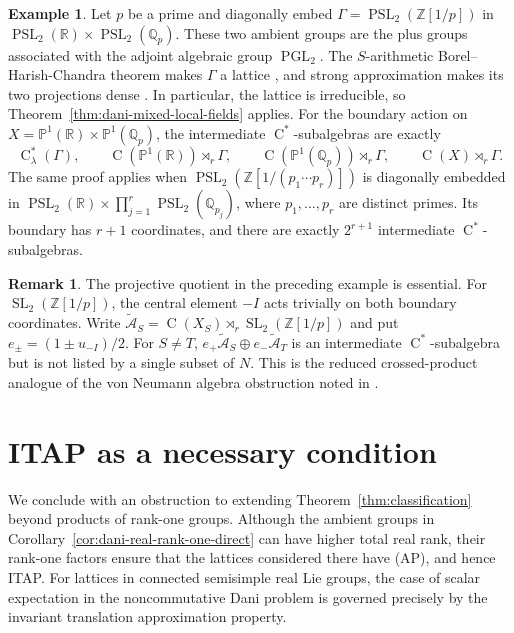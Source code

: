 \documentclass[11pt]{amsart}
\numberwithin{equation}{section}
\newcommand{\R}{\mathbb{R}}
\newcommand{\Z}{\mathbb{Z}}
\newcommand{\Q}{\mathbb{Q}}
\newcommand{\PSL}{\operatorname{PSL}}
\newcommand{\SL}{\operatorname{SL}}
\newcommand{\PGL}{\operatorname{PGL}}
\newcommand{\rC}{\operatorname{C}}
\theoremstyle{definition}
\newtheorem{remark}[theorem]{Remark}
\newtheorem{example}[theorem]{Example}
\begin{document}
	\begin{example}
		Let $p$ be a prime and diagonally embed $\Gamma=\PSL_2(\Z[1/p])$ in
		$\PSL_2(\R)\times\PSL_2(\Q_p)$.
		These two ambient groups are the plus groups associated with the adjoint
		algebraic group $\PGL_2$.
		The $S$-arithmetic Borel--Harish-Chandra theorem makes $\Gamma$ a lattice
		\cite[Theorem~I.3.2.5]{Ma91}, and strong approximation makes its two projections
		dense \cite[\S II.6.8]{Ma91}. In particular, the lattice is
		irreducible, so Theorem~\ref{thm:dani-mixed-local-fields} applies. For the
		boundary action on
		$X=\mathbb P^1(\R)\times\mathbb P^1(\Q_p)$, the intermediate
		$\rC^*$-subalgebras are exactly
		\[
		\rC^*_\lambda(\Gamma),\qquad
		\rC(\mathbb P^1(\R))\rtimes_r\Gamma,\qquad
		\rC(\mathbb P^1(\Q_p))\rtimes_r\Gamma,\qquad
		\rC(X)\rtimes_r\Gamma.
		\]
		The same proof applies when
		$\PSL_2\left(\Z\left[1/(p_1\cdots p_r)\right]\right)$ is diagonally embedded in
		$\PSL_2(\R)\times\prod_{j=1}^r\PSL_2(\Q_{p_j})$, where
		$p_1,\ldots,p_r$ are distinct primes. Its boundary has $r+1$
		coordinates, and there are exactly $2^{r+1}$ intermediate $\rC^*$-subalgebras.
	\end{example}
	
	\begin{remark}
		The projective quotient in the preceding example is essential. For
		$\SL_2(\Z[1/p])$, the central element $-I$ acts trivially on both boundary
		coordinates. Write
		\(\widetilde{\mathcal A}_S=\rC(X_S)\rtimes_r\SL_2(\Z[1/p])\) and put
		\(e_\pm=(1\pm u_{-I})/2\). For \(S\neq T\),
		\(e_+\widetilde{\mathcal A}_S\oplus
		e_-\widetilde{\mathcal A}_T\) is an intermediate \(\rC^*\)-subalgebra but is not listed by a single
		subset of \(N\). This is the reduced crossed-product analogue of the von Neumann
		algebra obstruction noted in \cite[Remark following the proof of Theorem~A]{BH23}.
	\end{remark}
	
	\section{ITAP as a necessary condition}\label{sec:scalar-itap}
	
	We conclude with an obstruction to extending Theorem~\ref{thm:classification} beyond products of rank-one groups. Although the ambient groups in Corollary~\ref{cor:dani-real-rank-one-direct} can have higher total real rank, their rank-one factors ensure that the lattices considered there have {\rm(AP)}, and hence {\rm ITAP}. For lattices in connected semisimple real Lie groups, the case of scalar expectation in the noncommutative Dani problem is governed precisely by the invariant translation approximation property.
	
\end{document}
